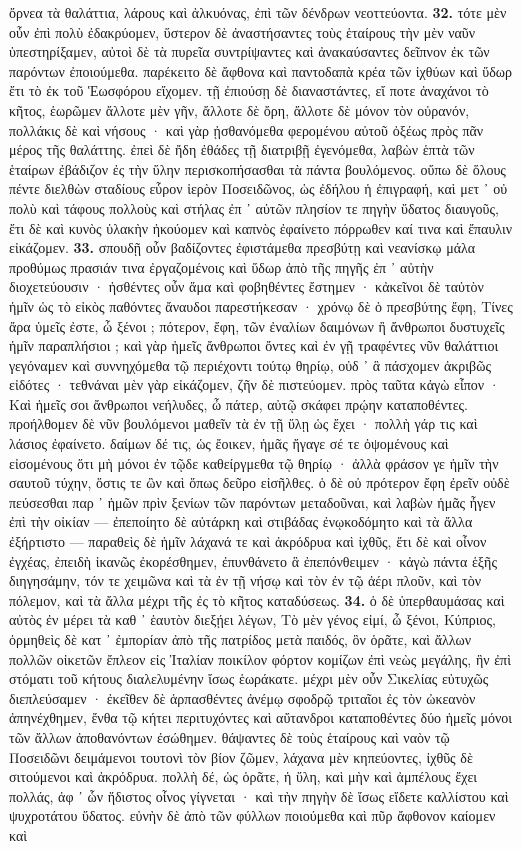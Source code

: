 \documentclass[a4paper, 11pt, oneside, polutonikogreek, german]{article}
\begin{document}
ὄρνεα τὰ θαλάττια, λάρους καὶ ἀλκυόνας, ἐπὶ τῶν δένδρων νεοττεύοντα. \textbf{32.} τότε μὲν οὖν ἐπὶ πολὺ ἐδακρύομεν, ὕστερον δὲ ἀναστήσαντες τοὺς ἑταίρους τὴν μὲν ναῦν ὑπεστηρίξαμεν, αὐτοὶ δὲ τὰ πυρεῖα συντρίψαντες καὶ ἀνακαύσαντες δεῖπνον ἐκ τῶν παρόντων ἐποιούμεθα. παρέκειτο δὲ ἄφθονα καὶ παντοδαπὰ κρέα τῶν ἰχθύων καὶ ὕδωρ ἔτι τὸ ἐκ τοῦ Ἑωσφόρου εἴχομεν. τῇ ἐπιούσῃ δὲ διαναστάντες, εἴ ποτε ἀναχάνοι τὸ κῆτος, ἑωρῶμεν ἄλλοτε μὲν γῆν, ἄλλοτε δὲ ὄρη, ἄλλοτε δὲ μόνον τὸν οὐρανόν, πολλάκις δὲ καὶ νήσους · καὶ γὰρ ᾐσθανόμεθα φερομένου αὐτοῦ ὀξέως πρὸς πᾶν μέρος τῆς θαλάττης. ἐπεὶ δὲ ἤδη ἐθάδες τῇ διατριβῇ ἐγενόμεθα, λαβὼν ἑπτὰ τῶν ἑταίρων ἐβάδιζον ἐς τὴν ὕλην περισκοπήσασθαι τὰ πάντα βουλόμενος. οὔπω δὲ ὅλους πέντε διελθὼν σταδίους εὗρον ἱερὸν Ποσειδῶνος, ὡς ἐδήλου ἡ ἐπιγραφή, καὶ μετ ᾽ οὐ πολὺ καὶ τάφους πολλοὺς καὶ στήλας ἐπ ᾽ αὐτῶν πλησίον τε πηγὴν ὕδατος διαυγοῦς, ἔτι δὲ καὶ κυνὸς ὑλακὴν ἠκούομεν καὶ καπνὸς ἐφαίνετο πόρρωθεν καί τινα καὶ ἔπαυλιν εἰκάζομεν. \textbf{33.} σπουδῇ οὖν βαδίζοντες ἐφιστάμεθα πρεσβύτῃ καὶ νεανίσκῳ μάλα προθύμως πρασιάν τινα ἐργαζομένοις καὶ ὕδωρ ἀπὸ τῆς πηγῆς ἐπ ᾽ αὐτὴν διοχετεύουσιν · ἡσθέντες οὖν ἅμα καὶ φοβηθέντες ἔστημεν · κἀκεῖνοι δὲ ταὐτὸν ἡμῖν ὡς τὸ εἰκὸς παθόντες ἄναυδοι παρεστήκεσαν · χρόνῳ δὲ ὁ πρεσβύτης ἔφη, Τίνες ἄρα ὑμεῖς ἐστε, ὦ ξένοι ; πότερον, ἔφη, τῶν ἐναλίων δαιμόνων ἢ ἄνθρωποι δυστυχεῖς ἡμῖν παραπλήσιοι ; καὶ γὰρ ἡμεῖς ἄνθρωποι ὄντες καὶ ἐν γῇ τραφέντες νῦν θαλάττιοι γεγόναμεν καὶ συννηχόμεθα τῷ περιέχοντι τούτῳ θηρίῳ, οὐδ ᾽ ἃ πάσχομεν ἀκριβῶς εἰδότες · τεθνάναι μὲν γὰρ εἰκάζομεν, ζῆν δὲ πιστεύομεν. πρὸς ταῦτα κἀγὼ εἶπον · Καὶ ἡμεῖς σοι ἄνθρωποι νεήλυδες, ὦ πάτερ, αὐτῷ σκάφει πρῴην καταποθέντες. προήλθομεν δὲ νῦν βουλόμενοι μαθεῖν τὰ ἐν τῇ ὕλῃ ὡς ἔχει · πολλὴ γάρ τις καὶ λάσιος ἐφαίνετο. δαίμων δέ τις, ὡς ἔοικεν, ἡμᾶς ἤγαγε σέ τε ὀψομένους καὶ εἰσομένους ὅτι μὴ μόνοι ἐν τῷδε καθείργμεθα τῷ θηρίῳ · ἀλλὰ φράσον γε ἡμῖν τὴν σαυτοῦ τύχην, ὅστις τε ὢν καὶ ὅπως δεῦρο εἰσῆλθες. ὁ δὲ οὐ πρότερον ἔφη ἐρεῖν οὐδὲ πεύσεσθαι παρ ᾽ ἡμῶν πρὶν ξενίων τῶν παρόντων μεταδοῦναι, καὶ λαβὼν ἡμᾶς ἦγεν ἐπὶ τὴν οἰκίαν --- ἐπεποίητο δὲ αὐτάρκη καὶ στιβάδας ἐνῳκοδόμητο καὶ τὰ ἄλλα ἐξήρτιστο --- παραθεὶς δὲ ἡμῖν λάχανά τε καὶ ἀκρόδρυα καὶ ἰχθῦς, ἔτι δὲ καὶ οἶνον ἐγχέας, ἐπειδὴ ἱκανῶς ἐκορέσθημεν, ἐπυνθάνετο ἃ ἐπεπόνθειμεν · κἀγὼ πάντα ἑξῆς διηγησάμην, τόν τε χειμῶνα καὶ τὰ ἐν τῇ νήσῳ καὶ τὸν ἐν τῷ ἀέρι πλοῦν, καὶ τὸν πόλεμον, καὶ τὰ ἄλλα μέχρι τῆς ἐς τὸ κῆτος καταδύσεως. \textbf{34.} ὁ δὲ ὑπερθαυμάσας καὶ αὐτὸς ἐν μέρει τὰ καθ ᾽ ἑαυτὸν διεξῄει λέγων, Τὸ μὲν γένος εἰμί, ὦ ξένοι, Κύπριος, ὁρμηθεὶς δὲ κατ ᾽ ἐμπορίαν ἀπὸ τῆς πατρίδος μετὰ παιδός, ὃν ὁρᾶτε, καὶ ἄλλων πολλῶν οἰκετῶν ἔπλεον εἰς Ἰταλίαν ποικίλον φόρτον κομίζων ἐπὶ νεὼς μεγάλης, ἣν ἐπὶ στόματι τοῦ κήτους διαλελυμένην ἴσως ἑωράκατε. μέχρι μὲν οὖν Σικελίας εὐτυχῶς διεπλεύσαμεν · ἐκεῖθεν δὲ ἁρπασθέντες ἀνέμῳ σφοδρῷ τριταῖοι ἐς τὸν ὠκεανὸν ἀπηνέχθημεν, ἔνθα τῷ κήτει περιτυχόντες καὶ αὔτανδροι καταποθέντες δύο ἡμεῖς μόνοι τῶν ἄλλων ἀποθανόντων ἐσώθημεν. θάψαντες δὲ τοὺς ἑταίρους καὶ ναὸν τῷ Ποσειδῶνι δειμάμενοι τουτονὶ τὸν βίον ζῶμεν, λάχανα μὲν κηπεύοντες, ἰχθῦς δὲ σιτούμενοι καὶ ἀκρόδρυα. πολλὴ δέ, ὡς ὁρᾶτε, ἡ ὕλη, καὶ μὴν καὶ ἀμπέλους ἔχει πολλάς, ἀφ ᾽ ὧν ἥδιστος οἶνος γίγνεται · καὶ τὴν πηγὴν δὲ ἴσως εἴδετε καλλίστου καὶ ψυχροτάτου ὕδατος. εὐνὴν δὲ ἀπὸ τῶν φύλλων ποιούμεθα καὶ πῦρ ἄφθονον καίομεν καὶ 
\end{document}
